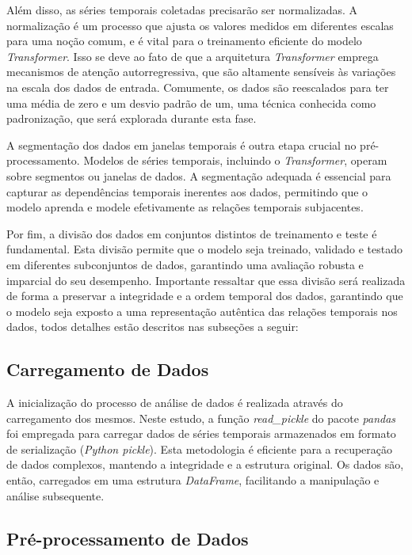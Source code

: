 Além disso, as séries temporais coletadas precisarão ser normalizadas. A normalização é um processo que ajusta os valores medidos em diferentes escalas para uma noção comum, e é vital para o treinamento eficiente do modelo \textit{Transformer}. Isso se deve ao fato de que a arquitetura \textit{Transformer} emprega mecanismos de atenção autorregressiva, que são altamente sensíveis às variações na escala dos dados de entrada. Comumente, os dados são reescalados para ter uma média de zero e um desvio padrão de um, uma técnica conhecida como padronização, que será explorada durante esta fase.

A segmentação dos dados em janelas temporais é outra etapa crucial no pré-processamento. Modelos de séries temporais, incluindo o \textit{Transformer}, operam sobre segmentos ou janelas de dados. A segmentação adequada é essencial para capturar as dependências temporais inerentes aos dados, permitindo que o modelo aprenda e modele efetivamente as relações temporais subjacentes.

Por fim, a divisão dos dados em conjuntos distintos de treinamento e teste é fundamental. Esta divisão permite que o modelo seja treinado, validado e testado em diferentes subconjuntos de dados, garantindo uma avaliação robusta e imparcial do seu desempenho. Importante ressaltar que essa divisão será realizada de forma a preservar a integridade e a ordem temporal dos dados, garantindo que o modelo seja exposto a uma representação autêntica das relações temporais nos dados, todos detalhes estão descritos nas subseções a seguir:

\subsection{Carregamento de Dados}

A inicialização do processo de análise de dados é realizada através do carregamento dos mesmos. Neste estudo, a função \textit{read\_pickle} do pacote \textit{pandas} foi empregada para carregar dados de séries temporais armazenados em formato de serialização (\textit{Python pickle}). Esta metodologia é eficiente para a recuperação de dados complexos, mantendo a integridade e a estrutura original. Os dados são, então, carregados em uma estrutura \textit{DataFrame}, facilitando a manipulação e análise subsequente.

\subsection{Pré-processamento de Dados}


